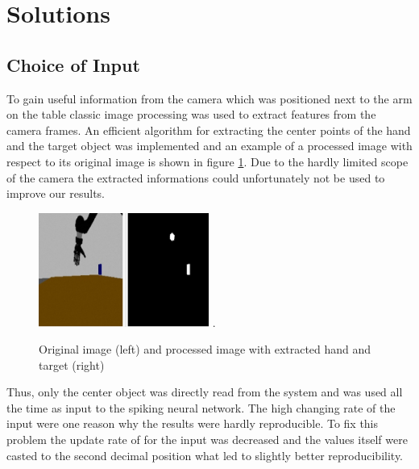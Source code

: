 \section{Solutions}
\subsection{Choice of Input}

To gain useful information from the camera which was positioned next to the arm on the table classic image processing was used to extract features from the camera frames. An efficient algorithm for extracting the center points of the hand and the target object was implemented and an example of a processed image with respect to its original image is shown in figure \ref{processed_pic}. Due to the hardly limited scope of the camera the extracted informations could unfortunately not be used to improve our results.\\

\begin{figure}[H]
	\centering
	\includegraphics[width=2.2in]{img/image_processing.png}
	\DeclareGraphicsExtensions.
	\caption{Original image (left) and processed image with extracted hand and target (right)}
	\label{processed_pic}
\end{figure}

Thus, only the center object was directly read from the system and was used all the time as input to the spiking neural network. The high changing rate of the input were one reason why the results were hardly reproducible. To fix this problem the update rate of for the input was decreased and the values itself were casted to the second decimal position what led to slightly better reproducibility. 

